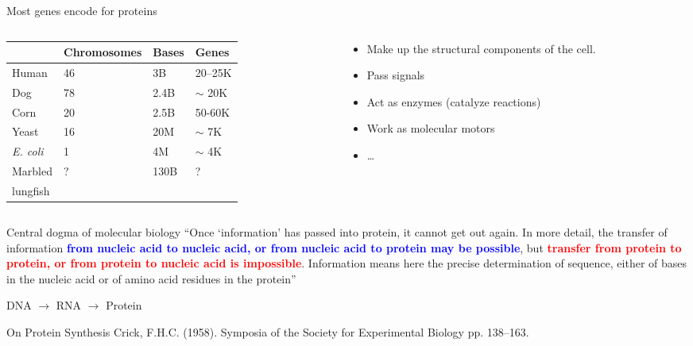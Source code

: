 \documentclass{beamer}
\renewcommand{\c}[1]{\begin{center}#1\end{center}}
\newcommand{\blu}[1]{\textcolor{blue}{\textbf{#1}}}
\newcommand{\red}[1]{\textcolor{red}{\textbf{#1}}}
\begin{document}
\begin{frame}{Most genes encode for proteins}
\begin{columns}
    \begin{column}{0.7\textwidth}
        \begin{tabular}{|l|l|l|l|}
        \hline
        & Chromosomes & Bases & Genes\\
        \hline
        Human & 46 & 3B & 20--25K\\
        Dog & 78 & 2.4B & $\sim$ 20K\\
        Corn & 20 & 2.5B & 50-60K\\
        Yeast & 16 & 20M & $\sim$ 7K\\
        \textit{E. coli} & 1 & 4M & $\sim$ 4K\\
        Marbled & ? & 130B & ?\\ 
        lungfish & & & \\
        \hline
        \end{tabular}
    \end{column}
    \begin{column}{0.3\textwidth}
        \small
        \begin{itemize}
            \item Make up the structural components of the cell.
            \item Pass signals
            \item Act as enzymes (catalyze reactions)
            \item Work as molecular motors
            \item \ldots
        \end{itemize}
    \end{column}
\end{columns}
\end{frame}

\begin{frame}{Central dogma of molecular biology}
``Once `information' has passed into protein, it cannot get out again. In more detail, the transfer of information \blu{from nucleic acid to nucleic acid, or from nucleic acid to protein may be possible}, but \red{transfer from protein to protein, or from protein to nucleic acid is impossible}. Information means here the precise determination of sequence, either of bases in the nucleic acid or of amino acid residues in the protein''\\
\c{DNA $\to$ RNA $\to$ Protein}
\small On Protein Synthesis Crick, F.H.C. (1958). Symposia of the Society for Experimental Biology pp. 138--163.
\end{frame}
\end{document}
